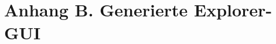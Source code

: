 \appendix
\chapter{Anhang B. Generierte Explorer-GUI}\label{explorergui}
\renewcommand{\thefigure}{B\arabic{figure}} 
\setcounter{figure}{0}
